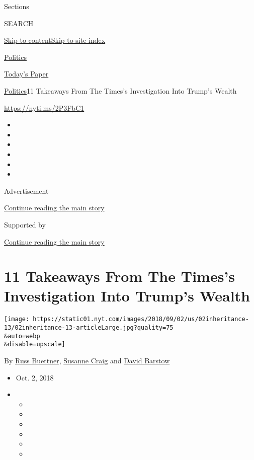 Sections

SEARCH

\protect\hyperlink{site-content}{Skip to
content}\protect\hyperlink{site-index}{Skip to site index}

\href{https://www.nytimes.com/section/politics}{Politics}

\href{https://myaccount.nytimes.com/auth/login?response_type=cookie\&client_id=vi}{}

\href{https://www.nytimes.com/section/todayspaper}{Today's Paper}

\href{/section/politics}{Politics}\textbar{}11 Takeaways From The
Times's Investigation Into Trump's Wealth

\url{https://nyti.ms/2P3FbC1}

\begin{itemize}
\item
\item
\item
\item
\item
\item
\end{itemize}

Advertisement

\protect\hyperlink{after-top}{Continue reading the main story}

Supported by

\protect\hyperlink{after-sponsor}{Continue reading the main story}

\hypertarget{11-takeaways-from-the-timess-investigation-into-trumps-wealth}{%
\section{11 Takeaways From The Times's Investigation Into Trump's
Wealth}\label{11-takeaways-from-the-timess-investigation-into-trumps-wealth}}

\texttt{[image: https://static01.nyt.com/images/2018/09/02/us/02inheritance-13/02inheritance-13-articleLarge.jpg?quality=75\\\&auto=webp\\\&disable=upscale]}

By \href{https://www.nytimes.com/by/russ-buettner}{Russ Buettner},
\href{https://www.nytimes.com/by/susanne-craig}{Susanne Craig} and
\href{https://www.nytimes.com/by/david-barstow}{David Barstow}

\begin{itemize}
\item
  Oct. 2, 2018
\item
  \begin{itemize}
  \item
  \item
  \item
  \item
  \item
  \item
  \end{itemize}
\end{itemize}

